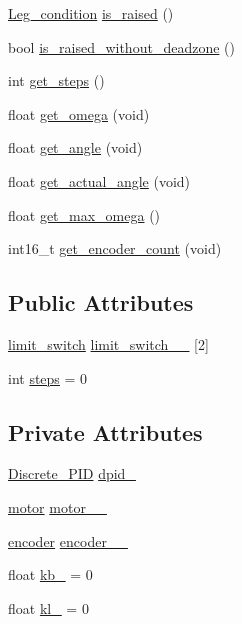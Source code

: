 \begin{DoxyCompactItemize}
\mbox{\hyperlink{leg_8h_acd2839a3551530e84aeae79009128ae0}{Leg\+\_\+condition}} \mbox{\hyperlink{classleg_a24893e209229c5a70d748f2471cd4370}{is\+\_\+raised}} ()
\item 
bool \mbox{\hyperlink{classleg_a1dbdd2bb120d877c15b1ea831b720135}{is\+\_\+raised\+\_\+without\+\_\+deadzone}} ()
\item 
int \mbox{\hyperlink{classleg_a36761ba08ae602b76c4adf168d2ae531}{get\+\_\+steps}} ()
\item 
float \mbox{\hyperlink{classleg_a90a92add134cc7f610202ae703ed8857}{get\+\_\+omega}} (void)
\item 
float \mbox{\hyperlink{classleg_a0f98905721d2f20536b7dc908597263e}{get\+\_\+angle}} (void)
\item 
float \mbox{\hyperlink{classleg_afcbf0d3a49ba8e092529f74364321e54}{get\+\_\+actual\+\_\+angle}} (void)
\item 
float \mbox{\hyperlink{classleg_ad3d8cc47a4bbed8c1781f86966b18207}{get\+\_\+max\+\_\+omega}} ()
\item 
int16\+\_\+t \mbox{\hyperlink{classleg_ab7d470db701c7745266338157b79e1d0}{get\+\_\+encoder\+\_\+count}} (void)
\end{DoxyCompactItemize}
\subsection*{Public Attributes}
\begin{DoxyCompactItemize}
\item 
\mbox{\hyperlink{structlimit__switch}{limit\+\_\+switch}} \mbox{\hyperlink{classleg_a3c984e90c4004c8dae1e2723fc7eaf52}{limit\+\_\+switch\+\_\+\+\_\+}} \mbox{[}2\mbox{]}
\item 
int \mbox{\hyperlink{classleg_a8056ae3fb3e8df59e560316932a2be0d}{steps}} = 0
\end{DoxyCompactItemize}
\subsection*{Private Attributes}
\begin{DoxyCompactItemize}
\item 
\mbox{\hyperlink{class_discrete___p_i_d}{Discrete\+\_\+\+P\+ID}} \mbox{\hyperlink{classleg_a8899cef4707a42110cc1fc32b3ea8a6b}{dpid\+\_\+}}
\item 
\mbox{\hyperlink{classmotor}{motor}} \mbox{\hyperlink{classleg_af069ccf74985349429d9bb5f69e751ab}{motor\+\_\+\+\_\+}}
\item 
\mbox{\hyperlink{classencoder}{encoder}} \mbox{\hyperlink{classleg_af6548dbf60a17b49bb4e1da05d0fa933}{encoder\+\_\+\+\_\+}}
\item 
float \mbox{\hyperlink{classleg_aa194c6b132602343180086d5833bf8c5}{kb\+\_\+}} = 0
\item 
float \mbox{\hyperlink{classleg_a144a04feb03f076f7883c46a90296485}{kl\+\_\+}} = 0
\end{DoxyCompactItemize}


